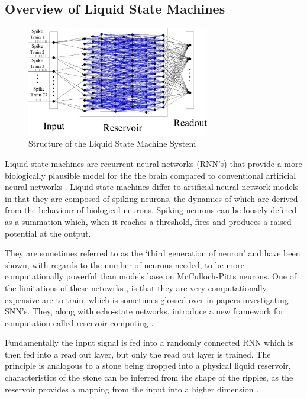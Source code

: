 \documentclass[fleqn,12pt]{wlscirep}
\begin{document}
\subsection*{Overview of Liquid State Machines}
\begin{figure}
    \includegraphics[width=8cm]{lsm.png}
    \centering
    \caption{Structure of the Liquid State Machine System\cite{jin_performance_2017}}
    \label{fig:LSM}
\end{figure}
Liquid state machines are recurrent neural networks (RNN's) that provide a more biologically plausible model for the the brain compared to conventional artificial neural networks \cite{yamazaki_cerebellum_2007}. Liquid state machines differ to artificial neural network models in that they are composed of spiking neurons, the dynamics of which are derived from the behaviour of biological neurons. Spiking neurons can be loosely defined as a summation which, when it reaches a threshold, fires and produces a raised potential at the output. 

They are sometimes referred to as the ‘third generation of neuron’ \cite{maass_networks_1997} and have been shown, with regards to the number of neurons needed, to be more computationally powerful than models base on McCulloch-Pitts neurons. One of the limitations of these netowrks , is that they  are very computationally expensive  are to train, which is sometimes glossed over in papers investigating SNN's. They, along with echo-state networks, introduce a new framework for computation called reservoir computing \cite{jaeger_echo_nodate}
\cite{maass_real-time_2002}. 

Fundamentally the input signal is fed into a randomly connected RNN which is then fed into a read out layer, but only the read out layer is trained. The principle is analogous to a stone being dropped into a physical liquid reservoir, characteristics of the stone can be inferred from the shape of the ripples, as the reservoir provides a mapping from the input into a higher dimension \cite{schrauwen_overview_nodate}.
\end{document}
